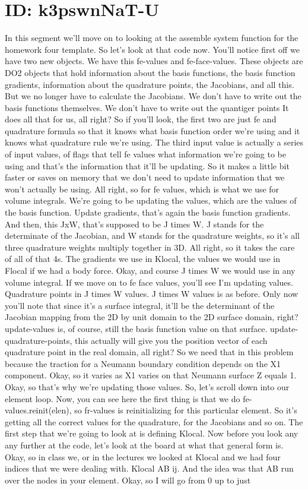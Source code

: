 \documentclass[10pt]{article}
\begin{document}
\section*{ID: k3pswnNaT-U}
In this segment we'll move on to looking at the assemble system function for the homework four template. So let's look at that code now. You'll notice first off we have two new objects. We have this fe-values and fe-face-values. These objects are DO2 objects that hold information about the basis functions, the basis function gradients, information about the quadrature points, the Jacobians, and all this. But we no longer have to calculate the Jacobians. We don't have to write out the basis functions themselves. We don't have to write out the quantiger points It does all that for us, all right? So if you'll look, the first two are just fe and quadrature formula so that it knows what basis function order we're using and it knows what quadrature rule we're using. The third input value is actually a series of input values, of flags that tell fe values what information we're going to be using and that's the information that it'll be updating. So it makes a little bit faster or saves on memory that we don't need to update information that we won't actually be using. All right, so for fe values, which is what we use for volume integrals. We're going to be updating the values, which are the values of the basis function. Update gradients, that's again the basis function gradients. And then, this JxW, that's supposed to be J times W. J stands for the determinate of the Jacobian, and W stands for the quadrature weights, so it's all three quadrature weights multiply together in 3D. All right, so it takes the care of all of that 4s. The gradients we use in Klocal, the values we would use in Flocal if we had a body force. Okay, and course J times W we would use in any volume integral. If we move on to fe face values, you'll see I'm updating values. Quadrature points in J times W values. J times W values is as before. Only now you'll note that since it's a surface integral, it'll be the determinant of the Jacobian mapping from the 2D by unit domain to the 2D surface domain, right? update-values is, of course, still the basis function value on that surface. update-quadrature-points, this actually will give you the position vector of each quadrature point in the real domain, all right? So we need that in this problem because the traction for a Neumann boundary condition depends on the X1 component. Okay, so it varies as X1 varies on that Neumann surface Z equals 1. Okay, so that's why we're updating those values. So, let's scroll down into our element loop. Now, you can see here the first thing is that we do fe-values.reinit(elen), so fr-values is reinitializing for this particular element. So it's getting all the correct values for the quadrature, for the Jacobians and so on. The first step that we're going to look at is defining Klocal. Now before you look any any further at the code, let's look at the board at what that general form is. Okay, so in class we, or in the lectures we looked at Klocal and we had four indices that we were dealing with. Klocal AB ij. And the idea was that AB run over the nodes in your element. Okay, so I will go from 0 up to just 
\end{document}
